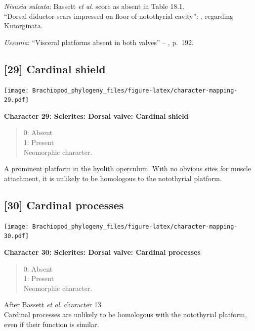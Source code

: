 \documentclass[openany]{book}
\theoremstyle{definition}
\theoremstyle{definition}
\theoremstyle{definition}
\theoremstyle{remark}
\begin{document}
\hypertarget{Nisusia_sulcata-coding-28}{}
\emph{Nisusia sulcata}: Bassett \emph{et al}.
\citeyearpar{Bassett2001Functionalmorphology} score as absent in Table
18.1.\\
``Dorsal diductor scars impressed on floor of notothyrial cavity'':
\citet{Williams2000LinguliformeaCraniiformea}, regarding Kutorginata.

\hypertarget{Ussunia-coding-28}{}
\emph{Ussunia}: ``Visceral platforms absent in both valves'' --
\citet{Williams2000LinguliformeaCraniiformea}, p.~192.

\subsection*{{[}29{]} Cardinal shield}\label{cardinal-shield}

\texttt{[image: Brachiopod\_phylogeny\_files/figure-latex/character-mapping-29.pdf]}

\textbf{Character 29: Sclerites: Dorsal valve: Cardinal shield}

\begin{quote}
0: Absent\\
1: Present\\
Neomorphic character.
\end{quote}

A prominent platform in the hyolith operculum. With no obvious sites for
muscle attachment, it is unlikely to be homologous to the notothyrial
platform.

\subsection*{{[}30{]} Cardinal processes}\label{cardinal-processes}

\texttt{[image: Brachiopod\_phylogeny\_files/figure-latex/character-mapping-30.pdf]}

\textbf{Character 30: Sclerites: Dorsal valve: Cardinal processes}

\begin{quote}
0: Absent\\
1: Present\\
Neomorphic character.
\end{quote}

After Bassett \emph{et al}.
\citeyearpar{Bassett2001Functionalmorphology} character 13.\\
Cardinal processes are unlikely to be homologous with the notothyrial
platform, even if their function is similar.
\end{document}
